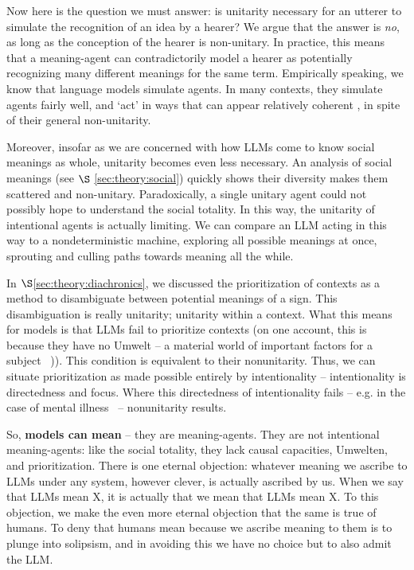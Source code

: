 Now here is the question we must answer: is unitarity necessary for an utterer to simulate the recognition of an idea by a hearer? We argue that the answer is \textit{no}, as long as the conception of the hearer is non-unitary. In practice, this means that a meaning-agent can contradictorily model a hearer as potentially recognizing many different meanings for the same term. Empirically speaking, we know that language models simulate agents. In many contexts, they simulate agents fairly well, and `act' in ways that can appear relatively coherent \citep{Andreas:LMsAMs}, in spite of their general non-unitarity.

Moreover, insofar as we are concerned with how LLMs come to know social meanings as whole, unitarity becomes even less necessary. An analysis of social meanings (see $\S$ \ref{sec:theory:social}) quickly shows their diversity makes them scattered and non-unitary. Paradoxically, a single unitary agent could not possibly hope to understand the social totality. In this way, the unitarity of intentional agents is actually limiting. We can compare an LLM acting in this way to a nondeterministic machine, exploring all possible meanings at once, sprouting and culling paths towards meaning all the while.

In $\S$\ref{sec:theory:diachronics}, we discussed the prioritization of contexts  as a method to disambiguate between potential meanings of a sign. This disambiguation is really unitarity; unitarity within a context. What this means for models is that LLMs fail to prioritize contexts (on one account, this is because they have no Umwelt -- a material world of important factors for a subject ~\citep{Uexkull:Umwelt})). This condition is equivalent to their nonunitarity. Thus, we can situate prioritization as made possible entirely by intentionality -- intentionality is directedness and focus. Where this directedness of intentionality fails -- e.g. in the case of mental illness~\citep{Deleuze:ThousandPlateaus} -- nonunitarity results.

So, \textbf{models can mean} -- they are meaning-agents. They are not intentional meaning-agents: like the social totality, they lack causal capacities, Umwelten, and prioritization. There is one eternal objection: whatever meaning we ascribe to LLMs under any system, however clever, is actually ascribed by us. When we say that LLMs mean X, it is actually that we mean that LLMs mean X. To this objection, we make the even more eternal objection that the same is true of humans. To deny that humans mean because we ascribe meaning to them is to plunge into solipsism, and in avoiding this we have no choice but to also admit the LLM.

